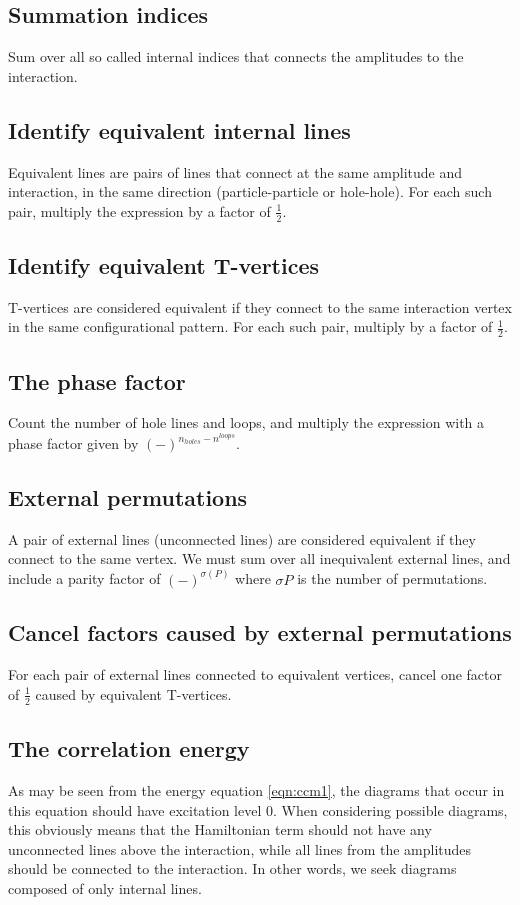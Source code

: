 \subsection{Summation indices}
Sum over all so called internal indices that connects the amplitudes to the interaction. 

\subsection{Identify equivalent internal lines}
Equivalent lines are pairs of lines that connect at the same amplitude and interaction, in the same direction (particle-particle or hole-hole). For each such pair, multiply the expression by a factor of $\frac{1}{2}$.

\subsection{Identify equivalent T-vertices}
T-vertices are considered equivalent if they connect to the same interaction vertex in the same configurational pattern. For each such pair, multiply by a factor of $\frac{1}{2}$.

\subsection{The phase factor}
Count the number of hole lines and loops, and multiply the expression with a phase factor given by $(-)^{n_{holes}-n^{loops}}$.

\subsection{External permutations}
A pair of external lines (unconnected lines) are considered equivalent if they connect to the same vertex. We must sum over all inequivalent external lines, and include a parity factor of $(-)^{\sigma(P)}$ where $\sigma{P}$ is the number of permutations.

\subsection{Cancel factors caused by external permutations}
For each pair of external lines connected to equivalent vertices, cancel one factor of $\frac{1}{2}$ caused by equivalent T-vertices. 

\subsection{The correlation energy}
As may be seen from the energy equation \ref{eqn:ccm1}, the diagrams that occur in this equation should have excitation level 0. When considering possible diagrams, this obviously means that the Hamiltonian term should not have any unconnected lines above the interaction, while all lines from the amplitudes should be connected to the interaction. In other words, we seek diagrams composed of only internal lines.

